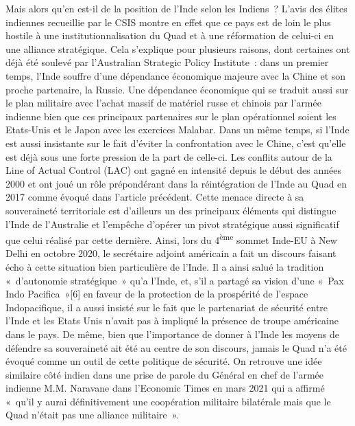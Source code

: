 \documentclass[11pt,a4paper]{article}
\begin{document}
Mais alors qu'en est-il de la position de l'Inde selon les Indiens~? L'avis des élites indiennes recueillie par le CSIS montre en effet que ce pays est de loin le plus hostile à une institutionnalisation du Quad et à une réformation de celui-ci en une alliance stratégique. Cela s'explique pour plusieurs raisons, dont certaines ont déjà été soulevé par l'Australian Strategic Policy Institute~: dans un premier temps, l'Inde souffre d'une dépendance économique majeure avec la Chine et son proche partenaire, la Russie. Une dépendance économique qui se traduit aussi sur le plan militaire avec l'achat massif de matériel russe et chinois par l'armée indienne bien que ces principaux partenaires sur le plan opérationnel soient les Etats-Unis et le Japon avec les exercices Malabar. Dans un même temps, si l'Inde est aussi insistante sur le fait d'éviter la confrontation avec le Chine, c'est qu'elle est déjà sous une forte pression de la part de celle-ci. Les conflits autour de la Line of Actual Control (LAC) ont gagné en intensité depuis le début des années 2000 et ont joué un rôle prépondérant dans la réintégration de l'Inde au Quad en 2017 comme évoqué dans l'article précédent. Cette menace directe à sa souveraineté territoriale est d'ailleurs un des principaux éléments qui distingue l'Inde de l'Australie et l'empêche d'opérer un pivot stratégique aussi significatif que celui réalisé par cette dernière. Ainsi, lors du 4\textsuperscript{ème} sommet Inde-EU à New Delhi en octobre 2020, le secrétaire adjoint américain a fait un discours faisant écho à cette situation bien particulière de l'Inde. Il a ainsi salué la tradition «~d'autonomie stratégique~» qu'a l'Inde, et, s'il a partagé sa vision d'une «~Pax Indo Pacifica~»{[}6{]} en faveur de la protection de la prospérité de l'espace Indopacifique, il a aussi insisté sur le fait que le partenariat de sécurité entre l'Inde et les Etats Unis n'avait pas à impliqué la présence de troupe américaine dans le pays. De même, bien que l'importance de donner à l'Inde les moyens de défendre sa souveraineté ait été au centre de son discours, jamais le Quad n'a été évoqué comme un outil de cette politique de sécurité. On retrouve une idée similaire côté indien dans une prise de parole du Général en chef de l'armée indienne M.M. Naravane dans l'Economic Times en mars 2021 qui a affirmé «~qu'il y aurai définitivement une coopération militaire bilatérale mais que le Quad n'était pas une alliance militaire~».
\end{document}
